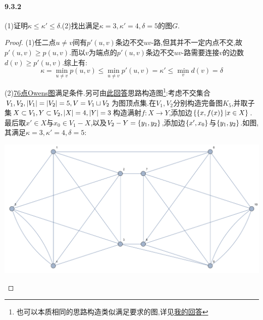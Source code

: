 \documentclass[11pt]{article}
\begin{document}
\paragraph{9.3.2}(1)证明$\kappa\leq\kappa'\leq\delta$.(2)找出满足$\kappa=3,\kappa'=4,\delta=5$的图$G$.
\begin{proof}
    (1)任二点$u\neq v$间有$p'(u,v)$条边不交$uv$-路,但其并不一定内点不交,故$p'(u,v)\geq p(u,v)$.而以$v$为端点的$p'(u,v)$条边不交$uv$-路需要连接$v$的边数$d(v)\geq p'(u,v)$.综上有:
    $$\kappa=\min_{u\neq v}p(u,v)\leq \min_{u\neq v}p'(u,v)=\kappa'\leq \min_v d(v)=\delta$$
    
    (2)\href{https://mathworld.wolfram.com/OwensGraphs.html}{76点Owens图}满足条件.另可由\href{https://math.stackexchange.com/a/3389232/1046467}{此回答}思路构造图\footnote{也可以本质相同的思路构造类似满足要求的图,详见\href{https://math.stackexchange.com/a/5005649/1046467}{我的回答}
    }:考虑不交集合$V_1,V_2,\left|V_1\right|=\left|V_2\right|=5,V=V_1\sqcup V_2$为图顶点集.在$V_1,V_2$分别构造完备图$K_5$,并取子集$X\subset V_1, Y\subset V_2, \left|X\right|=4, \left|Y\right|=3$构造满射$f:X\to Y$,添加边$\left\{\left\{x,f(x)\right\}|x\in X\right\}$.最后取$x'\in X$与$x_0\in V_1-X$,以及$V_2-Y=\left\{y_1,y_2\right\}$,添加边$\left\{x',x_0\right\}$与$\left\{y_1,y_2\right\}$.如图,其满足$\kappa=3,\kappa'=4,\delta=5$:

    \begin{center}
        \includegraphics[scale=0.3]{345graph.png}
    \end{center}\vspace{-0.8cm}
\end{proof}
\end{document}
